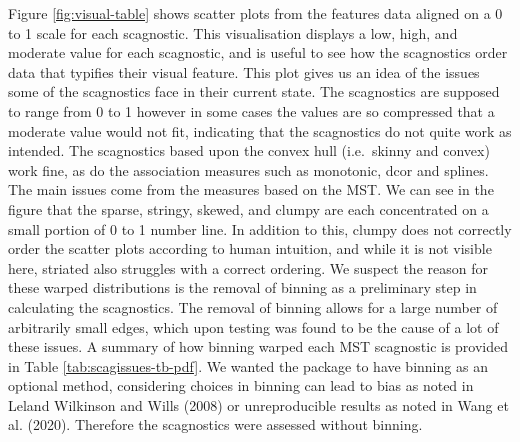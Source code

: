 Figure \ref{fig:visual-table} shows scatter plots from the features data aligned on a 0 to 1 scale for each scagnostic. This visualisation displays a low, high, and moderate value for each scagnostic, and is useful to see how the scagnostics order data that typifies their visual feature. This plot gives us an idea of the issues some of the scagnostics face in their current state. The scagnostics are supposed to range from 0 to 1 however in some cases the values are so compressed that a moderate value would not fit, indicating that the scagnostics do not quite work as intended. The scagnostics based upon the convex hull (i.e.~skinny and convex) work fine, as do the association measures such as monotonic, dcor and splines. The main issues come from the measures based on the MST. We can see in the figure that the sparse, stringy, skewed, and clumpy are each concentrated on a small portion of 0 to 1 number line. In addition to this, clumpy does not correctly order the scatter plots according to human intuition, and while it is not visible here, striated also struggles with a correct ordering. We suspect the reason for these warped distributions is the removal of binning as a preliminary step in calculating the scagnostics. The removal of binning allows for a large number of arbitrarily small edges, which upon testing was found to be the cause of a lot of these issues. A summary of how binning warped each MST scagnostic is provided in Table \ref{tab:scagissues-tb-pdf}. We wanted the package to have binning as an optional method, considering choices in binning can lead to bias as noted in Leland Wilkinson and Wills (2008) or unreproducible results as noted in Wang et al. (2020). Therefore the scagnostics were assessed without binning.

